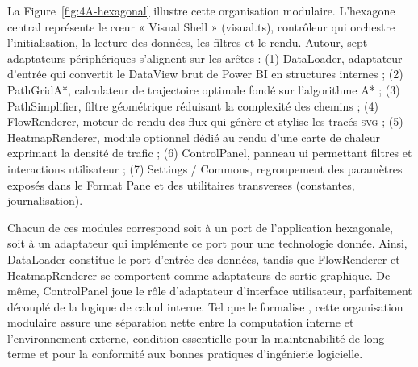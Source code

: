 La Figure~\ref{fig:4A-hexagonal} illustre cette organisation modulaire. L’hexagone central représente le cœur « Visual Shell » (visual.ts), contrôleur qui orchestre l’initialisation, la lecture des données, les filtres et le rendu. Autour, sept adaptateurs périphériques s’alignent sur les arêtes : (1) DataLoader, adaptateur d’entrée qui convertit le DataView brut de Power BI en structures internes ; (2) PathGrid\/A*, calculateur de trajectoire optimale fondé sur l’algorithme A* ; (3) PathSimplifier, filtre géométrique réduisant la complexité des chemins ; (4) FlowRenderer, moteur de rendu des flux qui génère et stylise les tracés \textsc{svg} ; (5) HeatmapRenderer, module optionnel dédié au rendu d’une carte de chaleur exprimant la densité de trafic ; (6) ControlPanel, panneau ui permettant filtres et interactions utilisateur ; (7) Settings / Commons, regroupement des paramètres exposés dans le Format Pane et des utilitaires transverses (constantes, journalisation).

Chacun de ces modules correspond soit à un port de l’application hexagonale, soit à un adaptateur qui implémente ce port pour une technologie donnée. Ainsi, DataLoader constitue le port d’entrée des données, tandis que FlowRenderer et HeatmapRenderer se comportent comme adaptateurs de sortie graphique. De même, ControlPanel joue le rôle d’adaptateur d’interface utilisateur, parfaitement découplé de la logique de calcul interne. Tel que le formalise \parencite{cockburn2008}, cette organisation modulaire assure une séparation nette entre la computation interne et l’environnement externe, condition essentielle pour la maintenabilité de long terme et pour la conformité aux bonnes pratiques d’ingénierie logicielle.
